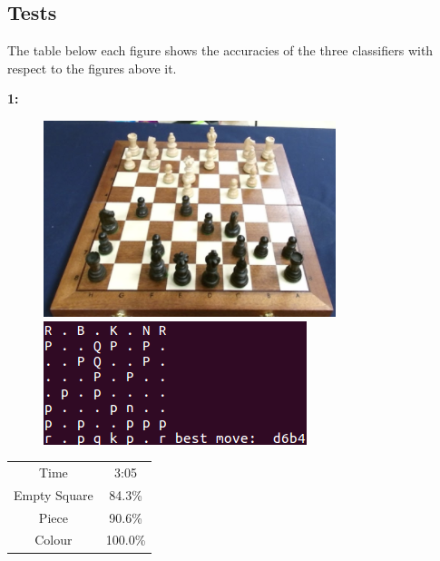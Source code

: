 \documentclass{l4proj}
\begin{document}
\begin{appendices}

\chapter{Tests}


\vspace{-10mm}
The table below each figure shows the accuracies of the three classifiers with respect to the figures above it.

\textbf{1:}
\begin{figure}[h!]
\includegraphics[scale=0.8]{ts/ts3.png} \includegraphics[scale=0.75]{ts/tsd3.png}
\label{ts3}
\end{figure}

\begin{table}[h!]
\centering
\begin{tabular}{|c|c|}
	\hline
	Time & 3:05 \\
	\rowcolor{brown!45}Empty Square & 84.3\%  \\
	Piece & 90.6\% \\
	\rowcolor{brown!45} Colour & 100.0\% \\
	\hline
\end{tabular}
\end{table}


\end{appendices}
\end{document}
